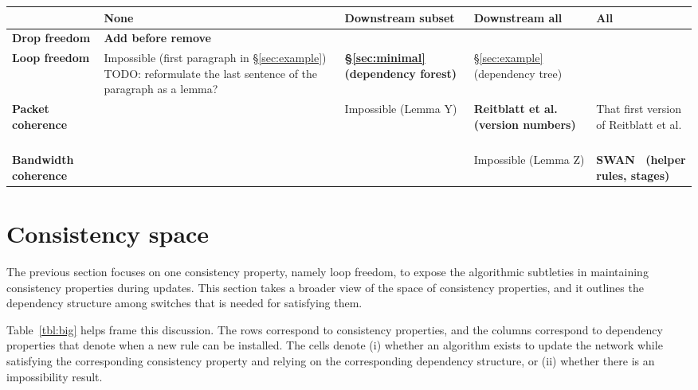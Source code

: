 \begin{table*}[t!]
\begin{center}
\begin{tabular}{p{1in}|p{1in}|p{1in}|p{1in}|p{1in}|}
&
  \textbf{None}
&
  \textbf{Downstream subset}
&
  \textbf{Downstream all}
&
  \textbf{All}
\ \\ \hline

  \textbf{Drop freedom}
&
  \textbf{Add before remove}
&
&
&
\ \\ \hline

  \textbf{Loop freedom}
&
  Impossible (first paragraph in \S\ref{sec:example}) TODO: reformulate the last sentence of the paragraph as a lemma?
&
  \textbf{\S\ref{sec:minimal} (dependency forest)}
&
  \S\ref{sec:example} (dependency tree)
&
\ \\ \hline

  \textbf{Packet coherence}
&
 
&
  Impossible (Lemma Y)
&
  \textbf{Reitblatt et al.~\cite{safeupdate} (version numbers)}
&
  That first version of Reitblatt et al. \cite{dontknow}
\ \\ \hline

  \textbf{Bandwidth coherence}
&
 
&
  
&
  Impossible (Lemma Z)
&
  \textbf{SWAN~\cite{swan} (helper rules, stages)}
\ \\ \hline
\end{tabular}
\end{center}
\caption{something}
\label{tbl:big}
\end{table*}

\section{Consistency space}
\label{sec:table}

The previous section focuses on one consistency property, namely loop freedom, to expose the algorithmic subtleties in maintaining consistency properties during updates. This section takes a broader view of the space of consistency properties, and it outlines the dependency structure among switches that is needed for satisfying them.

Table~\ref{tbl:big} helps frame this discussion. The rows correspond to consistency properties, and the columns correspond to dependency properties that denote when a new rule can be installed. The cells denote (i) whether an algorithm exists to update the network while satisfying the corresponding consistency property and relying on the corresponding dependency structure, or (ii) whether there is an impossibility result.

